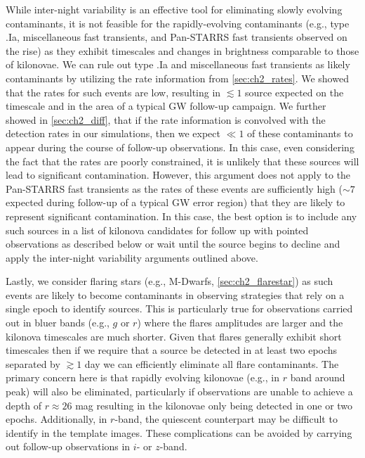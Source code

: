 While inter-night variability is an effective tool for eliminating slowly evolving contaminants, it is not feasible for the rapidly-evolving contaminants (e.g., type .Ia, miscellaneous fast transients, and Pan-STARRS fast transients observed on the rise) as they exhibit timescales and changes in brightness comparable to those of kilonovae. We can rule out type .Ia and miscellaneous fast transients as likely contaminants by utilizing the rate information from \cref{sec:ch2_rates}. We showed that the rates for such events are low, resulting in $\lesssim1$ source expected on the timescale and in the area of a typical GW follow-up campaign. We further showed in \cref{sec:ch2_diff}, that if the rate information is convolved with the detection rates in our simulations, then we expect $\ll 1$ of these contaminants to appear during the course of follow-up observations. In this case, even considering the fact that the rates are poorly constrained, it is unlikely that these sources will lead to significant contamination. However, this argument does not apply to the Pan-STARRS fast transients as the rates of these events are sufficiently high ($\sim 7$ expected during follow-up of a typical GW error region) that they are likely to represent significant contamination. In this case, the best option is to include any such sources in a list of kilonova candidates for follow up with pointed observations as described below or wait until the source begins to decline and apply the inter-night variability arguments outlined above. 

Lastly, we consider flaring stars (e.g., M-Dwarfs, \cref{sec:ch2_flarestar}) as such events are likely to become contaminants in observing strategies that rely on a single epoch to identify sources. This is particularly true for observations carried out in bluer bands (e.g., $g$ or $r$) where the flares amplitudes are larger and the kilonova timescales are much shorter. Given that flares generally exhibit short timescales \citep[minutes to hours][]{Berger+13} then if we require that a source be detected in at least two epochs separated by $\gtrsim1$ day we can efficiently eliminate all flare contaminants. The primary concern here is that rapidly evolving kilonovae (e.g., in $r$ band around peak) will also be eliminated, particularly if observations are unable to achieve a depth of $r\approx26$ mag resulting in the kilonovae only being detected in one or two epochs. Additionally, in $r$-band, the quiescent counterpart may be difficult to identify in the template images. These complications can be avoided by carrying out follow-up observations in $i$- or $z$-band.

